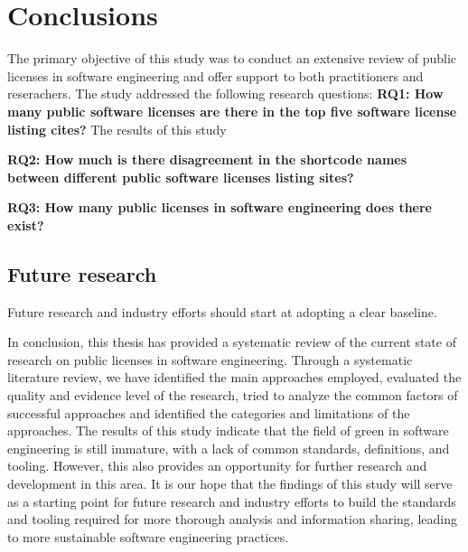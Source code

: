 \chapter{Conclusions\label{conclusions}}
The primary objective of this study was to conduct an extensive review of public licenses in software engineering and offer support to both practitioners and reserachers. The study addressed the following research questions:
\textbf{RQ1: How many public software licenses are there in the top five software license listing cites?} The results of this study

\textbf{RQ2: How much is there disagreement in the shortcode names between different public software licenses listing sites?}

\textbf{RQ3: How many public licenses in software engineering does there exist?}



\section{Future research}
Future research and industry efforts should start at adopting a clear baseline. 






In conclusion, this thesis has provided a systematic review of the current state of research on public licenses in software engineering. Through a systematic literature review, we have identified the main approaches employed, evaluated the quality and evidence level of the research, tried to analyze the common factors of successful approaches and identified the categories and limitations of the approaches. The results of this study indicate that the field of green in software engineering is still immature, with a lack of common standards, definitions, and tooling. However, this also provides an opportunity for further research and development in this area. It is our hope that the findings of this study will serve as a starting point for future research and industry efforts to build the standards and tooling required for more thorough analysis and information sharing, leading to more sustainable software engineering practices. 